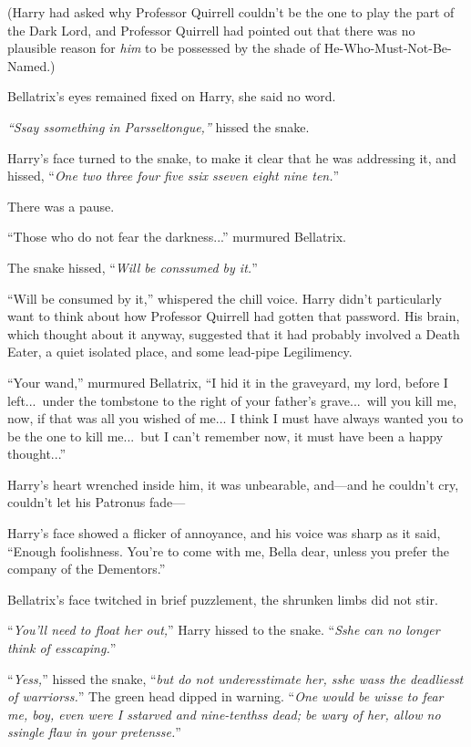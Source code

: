 (Harry had asked why Professor Quirrell couldn’t be the one to play the part of the Dark Lord, and Professor Quirrell had pointed out that there was no plausible reason for \emph{him} to be possessed by the shade of He-Who-Must-Not-Be-Named.)

Bellatrix’s eyes remained fixed on Harry, she said no word.

\emph{“Ssay ssomething in Parsseltongue,”} hissed the snake.

Harry’s face turned to the snake, to make it clear that he was addressing it, and hissed, “\emph{One two three four five ssix sseven eight nine ten.}”

There was a pause.

“Those who do not fear the darkness...” murmured Bellatrix.

The snake hissed, “\emph{Will be conssumed by it.}”

“Will be consumed by it,” whispered the chill voice. Harry didn’t particularly want to think about how Professor Quirrell had gotten that password. His brain, which thought about it anyway, suggested that it had probably involved a Death Eater, a quiet isolated place, and some lead-pipe Legilimency.

“Your wand,” murmured Bellatrix, “I hid it in the graveyard, my lord, before I left...\ under the tombstone to the right of your father’s grave...\ will you kill me, now, if that was all you wished of me... I think I must have always wanted you to be the one to kill me...\ but I can’t remember now, it must have been a happy thought...”

Harry’s heart wrenched inside him, it was unbearable, and—and he couldn’t cry, couldn’t let his Patronus fade—

Harry’s face showed a flicker of annoyance, and his voice was sharp as it said, “Enough foolishness. You’re to come with me, Bella dear, unless you prefer the company of the Dementors.”

Bellatrix’s face twitched in brief puzzlement, the shrunken limbs did not stir.

“\emph{You’ll need to float her out,}” Harry hissed to the snake. “\emph{Sshe can no longer think of esscaping.}”

“\emph{Yess,}” hissed the snake, “\emph{but do not underesstimate her, sshe wass the deadliesst of warriorss.}” The green head dipped in warning. “\emph{One would be wisse to fear me, boy, even were I sstarved and nine-tenthss dead; be wary of her, allow no ssingle flaw in your pretensse.}”


